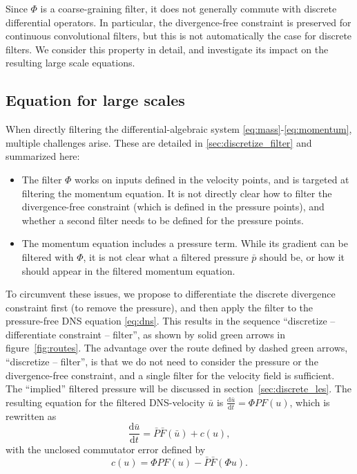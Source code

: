 \documentclass[preprint]{elsarticle}
\begin{document}
Since $\Phi$ is a coarse-graining filter, it does not generally
commute with discrete differential operators. In particular, the divergence-free
constraint is preserved for continuous convolutional filters, but this is not
automatically the case for discrete filters. We consider this property in
detail, and investigate its impact on the resulting large scale equations.

\subsection{Equation for large scales} \label{sec:filtered_dns}

When directly filtering the differential-algebraic system
\eqref{eq:mass}-\eqref{eq:momentum}, multiple challenges arise. These are detailed
in \ref{sec:discretize_filter} and summarized here:
\begin{itemize}
    \item The filter $\Phi$ works on inputs defined in the velocity points, and
        is targeted at filtering the momentum equation. It is not directly clear
        how to filter the divergence-free constraint (which is defined in the
        pressure points), and whether a second filter
        needs to be defined for the pressure points.
    \item The momentum equation includes a pressure term. While its gradient
        can be filtered with $\Phi$, it is not clear what a filtered pressure
        $\bar{p}$ should be, or how it should appear in the filtered momentum
        equation.
\end{itemize}

To circumvent these issues, we propose to differentiate the discrete divergence
constraint first (to remove the pressure), and then apply the filter to the
pressure-free DNS equation \eqref{eq:dns}. This results in the sequence
``discretize -- differentiate constraint -- filter'', as shown by solid green
arrows in figure~\ref{fig:routes}. The advantage over the route defined by
dashed green arrows, ``discretize -- filter'', is that we do not need to
consider the pressure or the divergence-free constraint, and a single filter for
the velocity field is sufficient. The ``implied'' filtered pressure will be
discussed in section~\ref{sec:discrete_les}. The resulting equation for the
filtered DNS-velocity $\bar{u}$ is $\frac{\mathrm{d} \bar{u}}{\mathrm{d} t} =
\Phi P F(u)$, which is rewritten as
\begin{equation} \label{eq:filtered_dns}
    \frac{\mathrm{d} \bar{u}}{\mathrm{d} t} = \bar{P} \bar{F}(\bar{u}) + c(u),
\end{equation}
with the unclosed commutator error defined by 
\begin{equation}\label{eq:commutator_error}
    c(u) = \Phi P F(u) - \bar{P} \bar{F}(\Phi u).
\end{equation}
\end{document}
